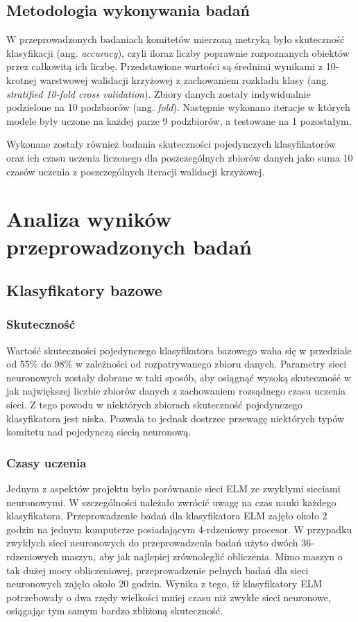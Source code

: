\documentclass[11pt, a4paper, titlepage]{report}
\begin{document}
\section{Metodologia wykonywania badań}

W przeprowadzonych badaniach komitetów mierzoną metryką było skuteczność klasyfikacji (ang. \textit{accuracy}), czyli iloraz liczby poprawnie rozpoznanych obiektów przez całkowitą ich liczbę.
Przedstawione wartości są średnimi wynikami z 10-krotnej warstwowej walidacji krzyżowej z zachowaniem rozkładu klasy (ang. \textit{stratified 10-fold cross validation}). Zbiory danych zostały indywidualnie podzielone na 10 podzbiorów (ang. \textit{fold}). Następnie wykonano iteracje w których modele były uczone na każdej parze 9 podzbiorów, a testowane na 1 pozostałym.

Wykonane zostały również badania skuteczności pojedynczych klasyfikatorów oraz ich czasu uczenia liczonego dla poszczególnych zbiorów danych jako suma 10 czasów uczenia z poszczególnych iteracji walidacji krzyżowej.

\chapter{Analiza wyników przeprowadzonych badań}

\section{Klasyfikatory bazowe}
\subsection{Skuteczność}
Wartość skuteczności pojedynczego klasyfikatora bazowego waha się w przedziale od 55\% do 98\% w zależności od rozpatrywanego zbioru danych. Parametry sieci neuronowych zostały dobrane w taki sposób, aby osiągnąć wysoką skuteczność w jak największej liczbie zbiorów danych z zachowaniem rozsądnego czasu uczenia sieci. Z tego powodu w niektórych zbiorach skuteczność pojedynczego klasyfikatora jest niska. Pozwala to jednak dostrzec przewagę niektórych typów komitetu nad pojedynczą siecią neuronową.
\subsection{Czasy uczenia}
Jednym z aspektów projektu było porównanie sieci ELM ze zwykłymi sieciami neuronowymi. W szczególności należało zwrócić uwagę na czas nauki każdego klasyfikatora. Przeprowadzenie badań dla klasyfikatora ELM zajęło około 2 godzin na jednym komputerze posiadającym 4-rdzeniowy procesor. W przypadku zwykłych sieci neuronowych do przeprowadzenia badań użyto dwóch 36-rdzeniowych maszyn, aby jak najlepiej zrównoleglić obliczenia. Mimo maszyn o tak dużej mocy obliczeniowej, przeprowadzenie pełnych badań dla sieci neuronowych zajęło około 20 godzin. Wynika z tego, iż klasyfikatory ELM potrzebowały o dwa rzędy wielkości mniej czasu niż zwykłe sieci neuronowe, osiągając tym samym bardzo zbliżoną skuteczność.
\end{document}
